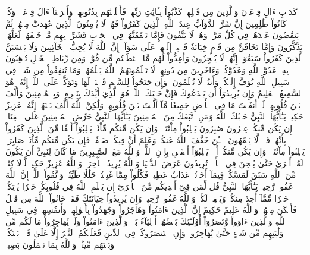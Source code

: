 كَدَأۡبِ ءَالِ فِرۡعَوۡنَ وَٱلَّذِينَ مِن قَبۡلِهِمۡۚ كَذَّبُواْ بِـَٔايَٰتِ رَبِّهِمۡ فَأَهۡلَكۡنَٰهُم بِذُنُوبِهِمۡ وَأَغۡرَقۡنَآ ءَالَ فِرۡعَوۡنَۚ وَكُلّٞ كَانُواْ ظَٰلِمِينَ
إِنَّ شَرَّ ٱلدَّوَآبِّ عِندَ ٱللَّهِ ٱلَّذِينَ كَفَرُواْ فَهُمۡ لَا يُؤۡمِنُونَ
ٱلَّذِينَ عَٰهَدتَّ مِنۡهُمۡ ثُمَّ يَنقُضُونَ عَهۡدَهُمۡ فِي كُلِّ مَرَّةٖ وَهُمۡ لَا يَتَّقُونَ
فَإِمَّا تَثۡقَفَنَّهُمۡ فِي ٱلۡحَرۡبِ فَشَرِّدۡ بِهِم مَّنۡ خَلۡفَهُمۡ لَعَلَّهُمۡ يَذَّكَّرُونَ
وَإِمَّا تَخَافَنَّ مِن قَوۡمٍ خِيَانَةٗ فَٱنۢبِذۡ إِلَيۡهِمۡ عَلَىٰ سَوَآءٍۚ إِنَّ ٱللَّهَ لَا يُحِبُّ ٱلۡخَآئِنِينَ
وَلَا يَحۡسَبَنَّ ٱلَّذِينَ كَفَرُواْ سَبَقُوٓاْۚ إِنَّهُمۡ لَا يُعۡجِزُونَ
وَأَعِدُّواْ لَهُم مَّا ٱسۡتَطَعۡتُم مِّن قُوَّةٖ وَمِن رِّبَاطِ ٱلۡخَيۡلِ تُرۡهِبُونَ بِهِۦ عَدُوَّ ٱللَّهِ وَعَدُوَّكُمۡ وَءَاخَرِينَ مِن دُونِهِمۡ لَا تَعۡلَمُونَهُمُ ٱللَّهُ يَعۡلَمُهُمۡۚ وَمَا تُنفِقُواْ مِن شَيۡءٖ فِي سَبِيلِ ٱللَّهِ يُوَفَّ إِلَيۡكُمۡ وَأَنتُمۡ لَا تُظۡلَمُونَ
۞وَإِن جَنَحُواْ لِلسَّلۡمِ فَٱجۡنَحۡ لَهَا وَتَوَكَّلۡ عَلَى ٱللَّهِۚ إِنَّهُۥ هُوَ ٱلسَّمِيعُ ٱلۡعَلِيمُ
وَإِن يُرِيدُوٓاْ أَن يَخۡدَعُوكَ فَإِنَّ حَسۡبَكَ ٱللَّهُۚ هُوَ ٱلَّذِيٓ أَيَّدَكَ بِنَصۡرِهِۦ وَبِٱلۡمُؤۡمِنِينَ
وَأَلَّفَ بَيۡنَ قُلُوبِهِمۡۚ لَوۡ أَنفَقۡتَ مَا فِي ٱلۡأَرۡضِ جَمِيعٗا مَّآ أَلَّفۡتَ بَيۡنَ قُلُوبِهِمۡ وَلَٰكِنَّ ٱللَّهَ أَلَّفَ بَيۡنَهُمۡۚ إِنَّهُۥ عَزِيزٌ حَكِيمٞ
يَـٰٓأَيُّهَا ٱلنَّبِيُّ حَسۡبُكَ ٱللَّهُ وَمَنِ ٱتَّبَعَكَ مِنَ ٱلۡمُؤۡمِنِينَ
يَـٰٓأَيُّهَا ٱلنَّبِيُّ حَرِّضِ ٱلۡمُؤۡمِنِينَ عَلَى ٱلۡقِتَالِۚ إِن يَكُن مِّنكُمۡ عِشۡرُونَ صَٰبِرُونَ يَغۡلِبُواْ مِاْئَتَيۡنِۚ وَإِن يَكُن مِّنكُم مِّاْئَةٞ يَغۡلِبُوٓاْ أَلۡفٗا مِّنَ ٱلَّذِينَ كَفَرُواْ بِأَنَّهُمۡ قَوۡمٞ لَّا يَفۡقَهُونَ
ٱلۡـَٰٔنَ خَفَّفَ ٱللَّهُ عَنكُمۡ وَعَلِمَ أَنَّ فِيكُمۡ ضَعۡفٗاۚ فَإِن يَكُن مِّنكُم مِّاْئَةٞ صَابِرَةٞ يَغۡلِبُواْ مِاْئَتَيۡنِۚ وَإِن يَكُن مِّنكُمۡ أَلۡفٞ يَغۡلِبُوٓاْ أَلۡفَيۡنِ بِإِذۡنِ ٱللَّهِۗ وَٱللَّهُ مَعَ ٱلصَّـٰبِرِينَ
مَا كَانَ لِنَبِيٍّ أَن يَكُونَ لَهُۥٓ أَسۡرَىٰ حَتَّىٰ يُثۡخِنَ فِي ٱلۡأَرۡضِۚ تُرِيدُونَ عَرَضَ ٱلدُّنۡيَا وَٱللَّهُ يُرِيدُ ٱلۡأٓخِرَةَۗ وَٱللَّهُ عَزِيزٌ حَكِيمٞ
لَّوۡلَا كِتَٰبٞ مِّنَ ٱللَّهِ سَبَقَ لَمَسَّكُمۡ فِيمَآ أَخَذۡتُمۡ عَذَابٌ عَظِيمٞ
فَكُلُواْ مِمَّا غَنِمۡتُمۡ حَلَٰلٗا طَيِّبٗاۚ وَٱتَّقُواْ ٱللَّهَۚ إِنَّ ٱللَّهَ غَفُورٞ رَّحِيمٞ
يَـٰٓأَيُّهَا ٱلنَّبِيُّ قُل لِّمَن فِيٓ أَيۡدِيكُم مِّنَ ٱلۡأَسۡرَىٰٓ إِن يَعۡلَمِ ٱللَّهُ فِي قُلُوبِكُمۡ خَيۡرٗا يُؤۡتِكُمۡ خَيۡرٗا مِّمَّآ أُخِذَ مِنكُمۡ وَيَغۡفِرۡ لَكُمۡۚ وَٱللَّهُ غَفُورٞ رَّحِيمٞ
وَإِن يُرِيدُواْ خِيَانَتَكَ فَقَدۡ خَانُواْ ٱللَّهَ مِن قَبۡلُ فَأَمۡكَنَ مِنۡهُمۡۗ وَٱللَّهُ عَلِيمٌ حَكِيمٌ
إِنَّ ٱلَّذِينَ ءَامَنُواْ وَهَاجَرُواْ وَجَٰهَدُواْ بِأَمۡوَٰلِهِمۡ وَأَنفُسِهِمۡ فِي سَبِيلِ ٱللَّهِ وَٱلَّذِينَ ءَاوَواْ وَّنَصَرُوٓاْ أُوْلَـٰٓئِكَ بَعۡضُهُمۡ أَوۡلِيَآءُ بَعۡضٖۚ وَٱلَّذِينَ ءَامَنُواْ وَلَمۡ يُهَاجِرُواْ مَا لَكُم مِّن وَلَٰيَتِهِم مِّن شَيۡءٍ حَتَّىٰ يُهَاجِرُواْۚ وَإِنِ ٱسۡتَنصَرُوكُمۡ فِي ٱلدِّينِ فَعَلَيۡكُمُ ٱلنَّصۡرُ إِلَّا عَلَىٰ قَوۡمِۭ بَيۡنَكُمۡ وَبَيۡنَهُم مِّيثَٰقٞۗ وَٱللَّهُ بِمَا تَعۡمَلُونَ بَصِيرٞ
